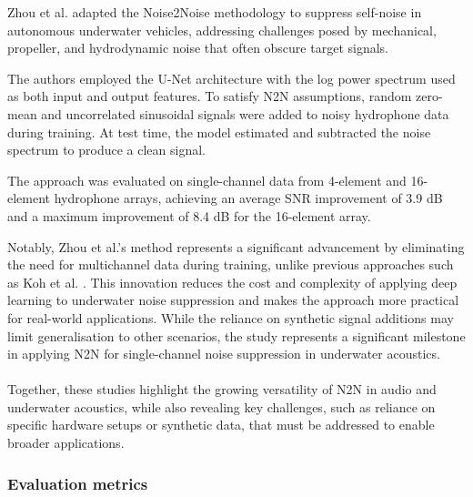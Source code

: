 Zhou et al. \cite{zhou_self-noise_2023} adapted the Noise2Noise methodology to suppress self-noise in autonomous underwater vehicles, addressing challenges posed by mechanical, propeller, and hydrodynamic noise that often obscure target signals.

The authors employed the U-Net architecture with the log power spectrum used as both input and output features. To satisfy N2N assumptions, random zero-mean and uncorrelated sinusoidal signals were added to noisy hydrophone data during training. At test time, the model estimated and subtracted the noise spectrum to produce a clean signal.

The approach was evaluated on single-channel data from 4-element and 16-element hydrophone arrays, achieving an average SNR improvement of 3.9 dB and a maximum improvement of 8.4 dB for the 16-element array. 

Notably, Zhou et al.’s method represents a significant advancement by eliminating the need for multichannel data during training, unlike previous approaches such as Koh et al. \cite{koh_underwater_2020}. This innovation reduces the cost and complexity of applying deep learning to underwater noise suppression and makes the approach more practical for real-world applications. While the reliance on synthetic signal additions may limit generalisation to other scenarios, the study represents a significant milestone in applying N2N for single-channel noise suppression in underwater acoustics.

\paragraph{}
Together, these studies highlight the growing versatility of N2N in audio and underwater acoustics, while also revealing key challenges, such as reliance on specific hardware setups or synthetic data, that must be addressed to enable broader applications.

\subsubsection{Evaluation metrics}

